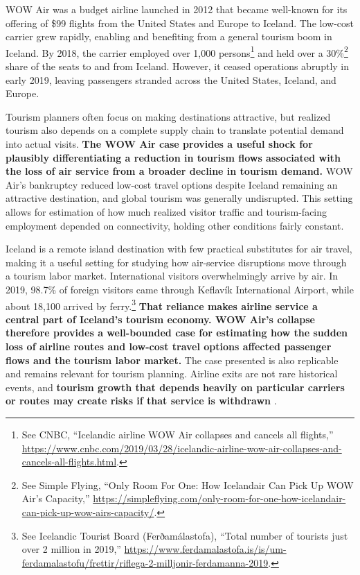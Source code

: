 \documentclass[12pt]{article}
\begin{document}
WOW Air was a budget airline launched in 2012 that became well-known for its offering of \$99 flights from the United States and Europe to Iceland. The low-cost carrier grew rapidly, enabling and benefiting from a general tourism boom in Iceland. By 2018, the carrier employed over 1,000 persons\footnote{See CNBC, ``Icelandic airline WOW Air collapses and cancels all flights,'' \url{https://www.cnbc.com/2019/03/28/icelandic-airline-wow-air-collapses-and-cancels-all-flights.html}.} and held over a 30\%\footnote{See Simple Flying, ``Only Room For One: How Icelandair Can Pick Up WOW Air's Capacity,'' \url{https://simpleflying.com/only-room-for-one-how-icelandair-can-pick-up-wow-airs-capacity/}.} share of the seats to and from Iceland. However, it ceased operations abruptly in early 2019, leaving passengers stranded across the United States, Iceland, and Europe.

Tourism planners often focus on making destinations attractive, but realized tourism also depends on a complete supply chain to translate potential demand into actual visits. \textbf{The WOW Air case provides a useful shock for plausibly differentiating a reduction in tourism flows associated with the loss of air service from a broader decline in tourism demand.} WOW Air's bankruptcy reduced low-cost travel options despite Iceland remaining an attractive destination, and global tourism was generally undisrupted. This setting allows for estimation of how much realized visitor traffic and tourism-facing employment depended on connectivity, holding other conditions fairly constant.


Iceland is a remote island destination with few practical substitutes for air travel, making it a useful setting for studying how air-service disruptions move through a tourism labor market. International visitors overwhelmingly arrive by air. In 2019, 98.7\% of foreign visitors came through Keflavík International Airport, while about 18,100 arrived by ferry.\footnote{See Icelandic Tourist Board (Ferðamálastofa), ``Total number of tourists just over 2 million in 2019,'' \url{https://www.ferdamalastofa.is/is/um-ferdamalastofu/frettir/riflega-2-milljonir-ferdamanna-2019}.} \textbf{That reliance makes airline service a central part of Iceland's tourism economy. WOW Air's collapse therefore provides a well-bounded case for estimating how the sudden loss of airline routes and low-cost travel options affected passenger flows and the tourism labor market.} The case presented is also replicable and remains relevant for tourism planning. Airline exits are not rare historical events, and \textbf{tourism growth that depends heavily on particular carriers or routes may create risks if that service is withdrawn} \citep{bachwich_wittman_2017_ulcc,sun_zheng_wang_wandelt_2025_cessation}.
\end{document}

